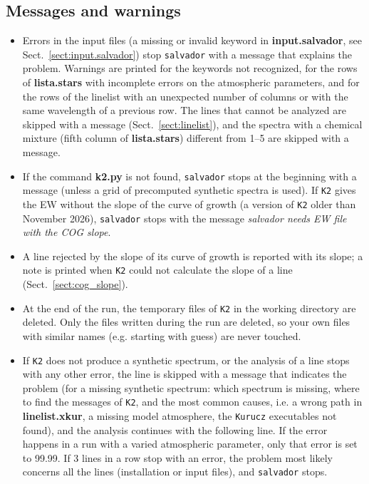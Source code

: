 \documentclass[modern]{aastex701}
\begin{document}
\subsection{Messages and warnings}
\begin{itemize}
    \item Errors in the input files (a missing or invalid keyword in {\bf input.salvador}, see Sect.~\ref{sect:input.salvador}) stop \texttt{salvador} with a message that explains the problem. Warnings are printed for the keywords not recognized, for the rows of {\bf lista.stars} with incomplete errors on the atmospheric parameters, and for the rows of the linelist with an unexpected number of columns or with the same wavelength of a previous row. The lines that cannot be analyzed are skipped with a message (Sect.~\ref{sect:linelist}), and the spectra with a chemical mixture (fifth column of {\bf lista.stars}) different from 1--5 are skipped with a message.
    \item If the command {\bf k2.py} is not found, \texttt{salvador} stops at the beginning with a message (unless a grid of precomputed synthetic spectra is used). If \texttt{K2} gives the EW without the slope of the curve of growth (a version of \texttt{K2} older than November 2026), \texttt{salvador} stops with the message {\it salvador needs EW file with the COG slope}.
    \item A line rejected by the slope of its curve of growth is reported with its slope; a note is printed when \texttt{K2} could not calculate the slope of a line (Sect.~\ref{sect:cog_slope}).
    \item At the end of the run, the temporary files of \texttt{K2} in the working directory are deleted. Only the files written during the run are deleted, so your own files with similar names (e.g. starting with guess) are never touched.
    \item If \texttt{K2} does not produce a synthetic spectrum, or the analysis of a line stops with any other error, the line is skipped with a message that indicates the problem (for a missing synthetic spectrum: which spectrum is missing, where to find the messages of \texttt{K2}, and the most common causes, i.e. a wrong path in {\bf linelist.xkur}, a missing model atmosphere, the \texttt{Kurucz} executables not found), and the analysis continues with the following line. If the error happens in a run with a varied atmospheric parameter, only that error is set to 99.99. If 3 lines in a row stop with an error, the problem most likely concerns all the lines (installation or input files), and \texttt{salvador} stops.

\end{itemize}
\end{document}
